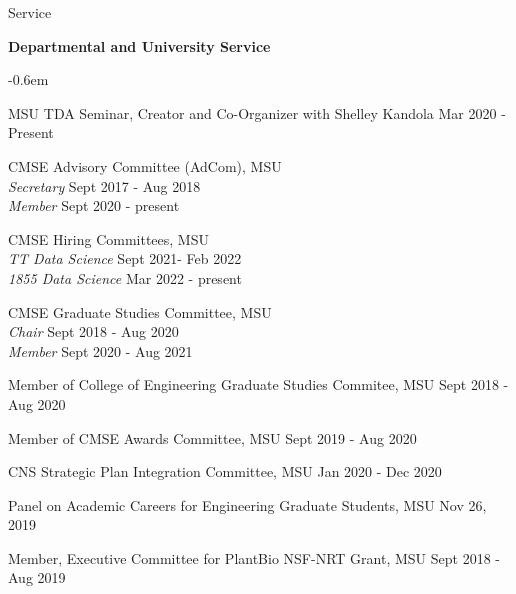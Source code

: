 \documentclass{resume} %
\begin{document}
%
\begin{rSection}{Service}



\textbf{Departmental and University Service}
\begin{list}{}{\leftmargin=1em}
   \itemsep -0.6em \vspace{-0.5em} %

\item
MSU TDA Seminar, Creator and Co-Organizer with Shelley Kandola  \hfill Mar 2020 - Present

\item
CMSE Advisory Committee (AdCom), MSU\\
\phantom{xxx} \textit{Secretary} \hfill  Sept 2017 - Aug 2018\\
\phantom{xxx} \textit{Member} \hfill Sept 2020 - present

\item CMSE Hiring Committees, MSU \\
\phantom{xxx} \textit{TT Data Science} \hfill  Sept 2021- Feb 2022\\
\phantom{xxx} \textit{1855 Data Science } \hfill Mar 2022 - present

\item
CMSE Graduate Studies Committee, MSU
\\
\phantom{xxx} \textit{Chair} \hfill  Sept 2018 - Aug 2020\\
\phantom{xxx} \textit{Member} \hfill Sept 2020 - Aug 2021
\item
Member of College of Engineering Graduate Studies Commitee, MSU \hfill Sept 2018 - Aug 2020
\item
Member of CMSE Awards Committee, MSU \hfill Sept 2019 - Aug 2020
\item
CNS Strategic Plan Integration Committee, MSU \hfill Jan 2020 - Dec 2020
\item
Panel on Academic Careers for Engineering Graduate Students, MSU \hfill Nov 26, 2019
\item Member, Executive Committee for PlantBio NSF-NRT Grant, MSU
\hfill Sept 2018 - Aug 2019


\end{list}
\end{rSection}
\end{document}
